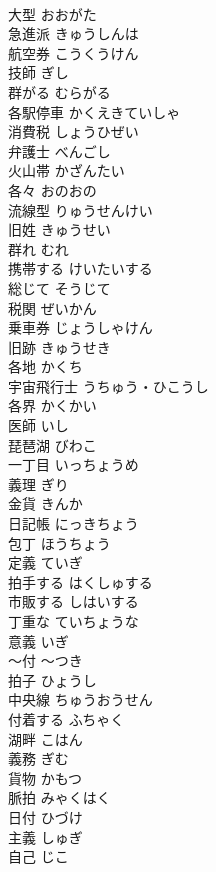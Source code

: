 \documentclass[8pt]{extreport}
\begin{document}
\begin{CJK}{UTF8}{min}
\\	大型	おおがた	
\\	急進派	きゅうしんは	
\\	航空券	こうくうけん	
\\	技師	ぎし	
\\	群がる	むらがる	
\\	各駅停車	かくえきていしゃ	
\\	消費税	しょうひぜい	
\\	弁護士	べんごし	
\\	火山帯	かざんたい	
\\	各々	おのおの	
\\	流線型	りゅうせんけい	
\\	旧姓	きゅうせい	
\\	群れ	むれ	
\\	携帯する	けいたいする	
\\	総じて	そうじて	
\\	税関	ぜいかん	
\\	乗車券	じょうしゃけん	
\\	旧跡	きゅうせき	
\\	各地	かくち	
\\	宇宙飛行士	うちゅう・ひこうし	
\\	各界	かくかい	
\\	医師	いし	
\\	琵琶湖	びわこ	
\\	一丁目	いっちょうめ	
\\	義理	ぎり	
\\	金貨	きんか	
\\	日記帳	にっきちょう	
\\	包丁	ほうちょう	
\\	定義	ていぎ	
\\	拍手する	はくしゅする	
\\	市販する	しはいする	
\\	丁重な	ていちょうな	
\\	意義	いぎ	
\\	～付	～つき	
\\	拍子	ひょうし	
\\	中央線	ちゅうおうせん	
\\	付着する	ふちゃく	
\\	湖畔	こはん	
\\	義務	ぎむ	
\\	貨物	かもつ	
\\	脈拍	みゃくはく	
\\	日付	ひづけ	
\\	主義	しゅぎ	
\\	自己	じこ	

\end{CJK}
\end{document}
